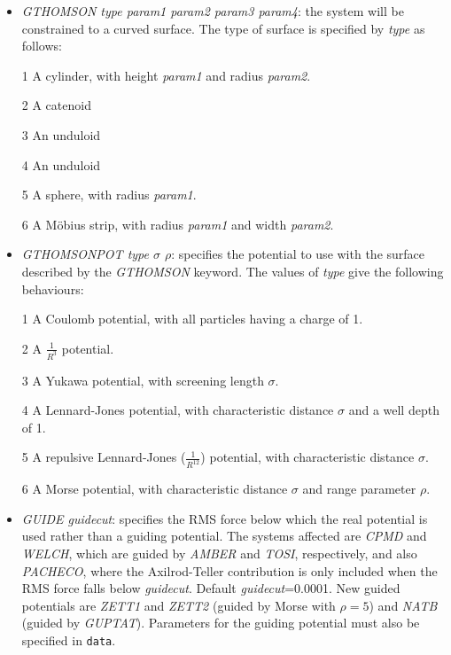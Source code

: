 \documentclass[12pt,a4paper,dvips]{article}
\begin{document}
\begin{itemize}
\item {\it GTHOMSON type param1 param2 param3 param4}: the system will be constrained to a curved surface.
The type of surface is specified by {\it type} as follows:

1 A cylinder, with height {\it param1} and radius {\it param2}.

2 A catenoid

3 An unduloid

4 An unduloid

5 A sphere, with radius {\it param1}.

6 A M\"{o}bius strip, with radius {\it param1} and width {\it param2}.

\item {\it GTHOMSONPOT type $\sigma$ $\rho$}: specifies the potential to use with the surface described by 
the {\it GTHOMSON} keyword. The values of {\it type} give the following behaviours:

1 A Coulomb potential, with all particles having a charge of 1.

2 A $\frac{\displaystyle 1}{\displaystyle R^{3}}$ potential.

3 A Yukawa potential, with screening length {\it $\sigma$}.

4 A Lennard-Jones potential, with characteristic distance {\it $\sigma$} and a well depth of 1.

5 A repulsive Lennard-Jones ($\frac{\displaystyle 1}{\displaystyle R^{12}}$) potential, 
with characteristic distance {\it $\sigma$}.

6 A Morse potential, with characteristic distance {\it $\sigma$} and range parameter {\it $\rho$}.

\item {\it GUIDE\/ guidecut}: specifies the RMS force below which the real potential is used
rather than a guiding potential. The systems affected are {\it CPMD\/} and {\it WELCH},
which are guided by {\it AMBER\/} and {\it TOSI\/}, respectively, and also {\it PACHECO\/},
where the Axilrod-Teller contribution is only included when the RMS force falls below
{\it guidecut\/}. Default {\it guidecut\/}=0.0001.
New guided potentials are {\it ZETT1} and {\it ZETT2} (guided by Morse with $\rho=5$) and
{\it NATB} (guided by {\it GUPTAT}). Parameters for the guiding potential must also be specified in
{\tt data}.


\end{itemize}
\end{document}
